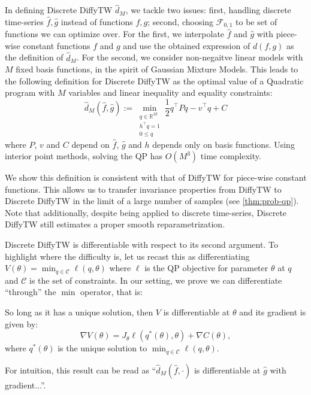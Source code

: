 In defining Discrete DiffyTW $\hat d_M$, we tackle two issues: first, handling discrete time-series $\hat f, \hat g$ instead of functions $f, g$; second, choosing $\mathcal F_{0,1}$ to be set of functions we can optimize over. For the first, we interpolate $\hat f$ and $\hat g$ with piece-wise constant functions $f$ and $g$ and use the obtained expression of $d(f, g)$ as the definition of $\hat d_M$. For the second, we consider non-negaitve linear models with $M$ fixed basis functions, in the spirit of Gaussian Mixture Models. This leads to the following definition for Discrete DiffyTW as the optimal value of a Quadratic program with $M$ variables and linear inequality and equality constraints:
\begin{equation*}
    \hat d_M(\hat f, \hat g) :=\min_{\substack{q\in\mathbb R^{M}\\h^\top q=1\\0 \leq q}}\frac{1}{2}q^\top Pq - v^\top q + C
\end{equation*}
where $P$, $v$ and $C$ depend on $\hat f$, $\hat g$ and $h$ depends only on basis functions. Using interior point methods, solving the QP has $O(M^3)$ time complexity.

We show this definition is consistent with that of DiffyTW for piece-wise constant functions. This allows us to transfer invariance properties from DiffyTW to Discrete DiffyTW in the limit of a large number of samples (see \cref{thm:prob-qp}). Note that additionally, despite being applied to discrete time-series, Discrete DiffyTW still estimates a proper smooth reparametrization. 

Discrete DiffyTW is differentiable with respect to its second argument. To highlight where the difficulty is, let us recast this as differentiating $V(\theta) = \min_{q\in\mathcal C}\ell(q, \theta)$ where $\ell$ is the QP objective for parameter $\theta$ at $q$ and $\mathcal C$ is the set of constraints. In our setting, we prove we can differentiate ``through'' the $\min$ operator, that is:
\begin{mdframed}
\begin{informaltheorem}
So long as it has a unique solution, then $V$ is differentiable at $\theta$ and its gradient is given by:
    \begin{equation}
        \nabla V(\theta) = J_\theta \ell(q^*(\theta), \theta) + \nabla C(\theta),
    \end{equation} where $q^*(\theta)$ is the unique solution to $\min_{q\in\mathcal C}\ell(q, \theta)$.
\end{informaltheorem}
\end{mdframed}
For intuition, this result can be read as ``$\hat d_M(\hat f, \cdot)$ is differentiable at $\hat g$ with gradient...''.

